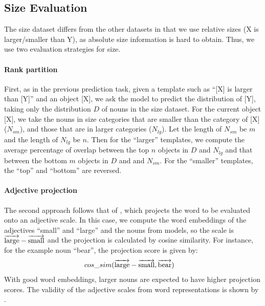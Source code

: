 \documentclass[11pt]{article}
\begin{document}
\subsection{Size Evaluation} \label{size-eval}
The size dataset differs from the other datasets in that we use relative sizes (X is larger/smaller than Y), as absolute size information is hard to obtain.
Thus, we use two evaluation strategies for size. 

\paragraph{Rank partition}
First, as in the previous prediction task, given a template such as ``[X] is larger than [Y]'' and an object [X], we ask the model to predict the distribution of [Y], taking only the distribution $D$ of nouns in the size dataset. For the current object [X], we take the nouns in size categories that are smaller than the category of [X] ($N_{sm}$), and those that are in larger categories ($N_{lg}$). Let the length of $N_{sm}$ be $m$ and the length of $N_{lg}$ be $n$. Then for the ``larger'' templates, we compute the average percentage of overlap between the top $n$ objects in $D$ and $N_{lg}$ and that between the bottom $m$ objects in $D$ and and $N_{sm}$. For the ``smaller'' templates, the ``top'' and ``bottom'' are reversed.

\paragraph{Adjective projection}
The second approach follows that of \citet{color-adj}, which projects the word to be evaluated onto an adjective scale. In this case, we compute the word embeddings of the adjectives ``small'' and ``large'' and the nouns from models, so the scale is $\overrightarrow{\textnormal{large}} - \overrightarrow{\textnormal{small}}$ and the projection is calculated by cosine similarity.
For instance, for the example noun ``bear'', the projection score is given by:
\vspace{-0.5em}
\begin{align*}
    &cos\_sim(\overrightarrow{\textnormal{large}} - \overrightarrow{\textnormal{small}}, \overrightarrow{\textnormal{bear}})
    \vspace{-0.5em}
\end{align*}
\noindent With good word embeddings, larger nouns are expected to have higher projection scores. The validity of the adjective scales from word representations is shown by \citet{kim-de-marneffe-2013-deriving}.
\end{document}

